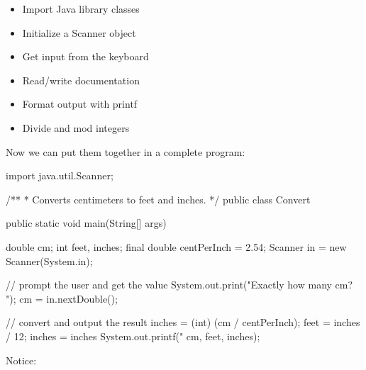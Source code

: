 \begin{multicols}{2}
\begin{itemize}



\item Import Java library classes
\item Initialize a Scanner object
\item Get input from the keyboard
\item Read/write documentation
\item Format output with printf
\item Divide and mod integers

\end{itemize}
\end{multicols}

Now we can put them together in a complete program:

\begin{code}
import java.util.Scanner;

/**
 * Converts centimeters to feet and inches.
 */
public class Convert {
    public static void main(String[] args) {
        double cm;
        int feet, inches;
        final double centPerInch = 2.54;
        Scanner in = new Scanner(System.in);

        // prompt the user and get the value
        System.out.print("Exactly how many cm? ");
        cm = in.nextDouble();

        // convert and output the result
        inches = (int) (cm / centPerInch);
        feet = inches / 12;
        inches = inches %
        System.out.printf("%
                          cm, feet, inches);
    }
}
\end{code}

Notice:

